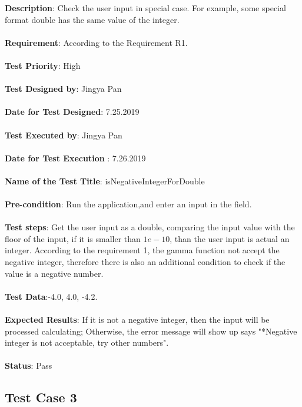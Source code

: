 \documentclass[a4paper, 11pt]{article}
\begin{document}
\textbf{Description}: Check the user input in special case. For example, some special format double has the same value of the integer.\\\\
\noindent
\textbf{Requirement}: According to the Requirement R1.\\\\
\noindent
\textbf{Test Priority}: High\\\\
\noindent
\textbf{Test Designed by}: Jingya Pan\\\\
\noindent
\textbf{Date for Test Designed}: 7.25.2019\\\\
\noindent
\textbf{Test Executed by}: Jingya Pan\\\\
\noindent
\textbf{Date for Test Execution} : 7.26.2019\\\\
\noindent
\textbf{Name of the Test Title}: isNegativeIntegerForDouble\\\\
\noindent
\textbf{Pre-condition}: Run the application,and enter an input in the field.\\\\
\noindent
\textbf{Test steps}: Get the user input as a double, comparing the input value with the floor of the input, if it is smaller than $1e-10$, than the user input is actual an integer. According to the requirement 1, the gamma function not accept the negative integer, therefore there is also an additional condition to check if the value is a negative number.\\\\
\noindent
\textbf{Test Data}:-4.0, 4.0, -4.2. \\\\
\noindent
\textbf{Expected Results}: If it is not a negative integer, then the input will be processed calculating; Otherwise, the error message will show up says "*Negative integer is not acceptable, try other numbers".\\\\
\noindent
\textbf{Status}: Pass

\subsection{Test Case 3}
\end{document}
